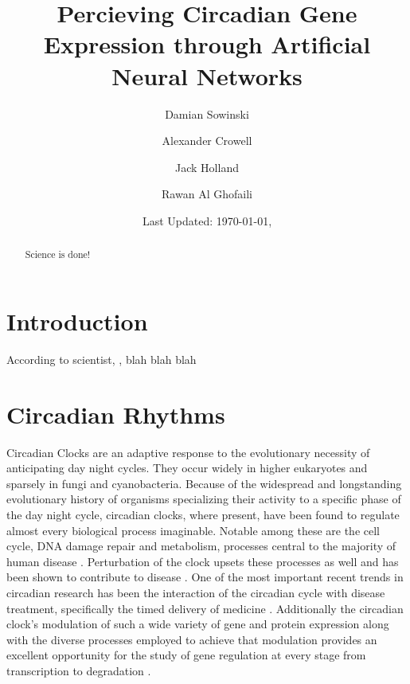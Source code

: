 \documentclass[prl,amsmath,amssymb,floatfix,superscriptaddress,notitlepage,twocolumn]{revtex4}
\begin{document}
\title{Percieving Circadian Gene Expression through Artificial Neural Networks}

\author{Damian Sowinski}

\author{Alexander Crowell}

\author{Jack Holland}

\author{Rawan Al Ghofaili}


\date{Last Updated: \today, \currenttime}

\begin{abstract}

Science is done!

\end{abstract}

\maketitle

\section{Introduction}
According to scientist, \cite{paper1}, blah blah blah

\section{Circadian Rhythms}
Circadian Clocks are an adaptive response to the evolutionary necessity of anticipating day night cycles.  They occur widely in higher eukaryotes and sparsely in fungi and cyanobacteria.  Because of the widespread and longstanding evolutionary history of organisms specializing their activity to a specific phase of the day night cycle, circadian clocks, where present, have been found to regulate almost every biological process imaginable.  Notable among these are the cell cycle, DNA damage repair and metabolism, processes central to the majority of human disease \cite{Dunlap99}.  Perturbation of the clock upsets these processes as well and has been shown to contribute to disease \cite{Bass10}.  One of the most important recent trends in circadian research has been the interaction of the circadian cycle with disease treatment, specifically the timed delivery of medicine \cite{Zhang14}.  Additionally the circadian clock's modulation of such a wide variety of gene and protein expression along with the diverse processes employed to achieve that modulation provides an excellent opportunity for the study of gene regulation at every stage from transcription to degradation \cite{Mehra09,Menet14}.
\end{document}
